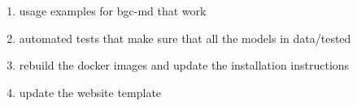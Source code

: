 \documentclass[a4paper]{article}
\begin{document}


%
\begin{enumerate}
		\item
			usage examples for bgc-md that work
		\item 
			automated tests that make sure that all the models in data/tested
		\item 
			rebuild the docker images and update the installation instructions
		\item  
			update the website template
\end{enumerate}
\end{document}
